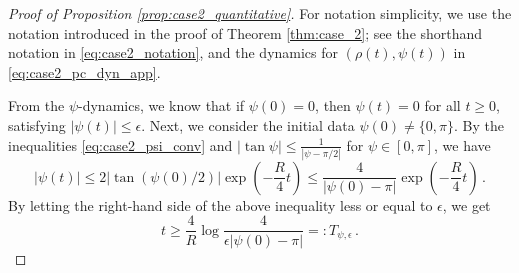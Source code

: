 \documentclass[10pt]{article}
\theoremstyle{definition}
\theoremstyle{definition}
\numberwithin{equation}{section}
\begin{document}
\begin{proof}[Proof of Proposition \ref{prop:case2_quantitative}]
For notation simplicity, we use the notation introduced in the proof of Theorem \ref{thm:case_2}; see the shorthand notation in \eqref{eq:case2_notation}, and the dynamics for $(\rho(t), \psi(t))$ in \eqref{eq:case2_pc_dyn_app}.

From the $\psi$-dynamics, we know that if $\psi(0) = 0$, then $\psi(t) = 0$ for all $t \geq 0$, satisfying $|\psi(t)| \leq \epsilon$.
Next, we consider the initial data $\psi(0) \neq \{0, \pi\}$.
By the inequalities \eqref{eq:case2_psi_conv} and $| \tan \psi| \leq \frac{1}{|\psi - \pi/2|}$ for $\psi \in [0,\pi]$, we have
\begin{equation*}
|\psi(t)| \leq 2 |\tan (\psi(0)/2)| \exp \left( -\frac{R}{4} t \right) \leq \frac{4}{|\psi(0) - \pi|} \exp \left( -\frac{R}{4} t \right) \, .
\end{equation*}
By letting the right-hand side of the above inequality less or equal to $\epsilon$, we get
\begin{equation*}
    t \geq \frac{4}{R} \log \frac{4}{\epsilon |\psi(0) - \pi|} =: T_{\psi, \epsilon} \, .
\end{equation*}


\end{proof}
\end{document}
